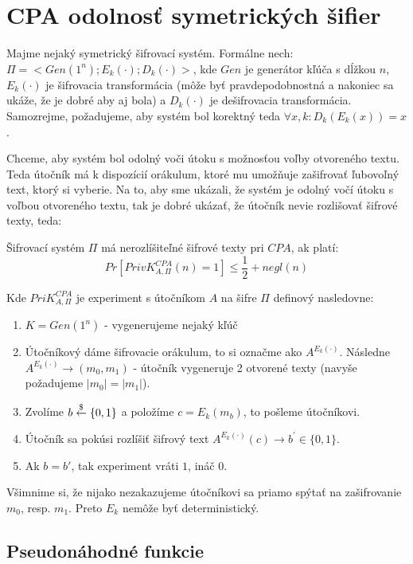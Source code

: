 \section{CPA odolnosť symetrických šifier}

Majme nejaký symetrický šifrovací systém. Formálne nech:
$\Pi = <Gen(1^n); E_k(\cdot); D_k(\cdot)>$, kde $Gen$ je generátor
kľúča s dĺžkou $n$, $E_k(\cdot)$ je šifrovacia transformácia (môže byť
pravdepodobnostná a nakoniec sa ukáže, že je dobré aby aj bola)
a $D_k(\cdot)$ je dešifrovacia transformácia. Samozrejme, požadujeme, aby
systém bol korektný teda $\forall x, k\colon D_k(E_k(x))=x$.

Chceme, aby systém bol odolný voči útoku s možnosťou voľby otvoreného textu.
Teda útočník má k dispozícií orákulum, ktoré mu umožňuje zašifrovať ľubovoľný
text, ktorý si vyberie. Na to, aby sme ukázali, že systém je odolný vočí 
útoku s voľbou otvoreného textu, tak je dobré ukázať, že útočník
nevie rozlišovať šifrové texty, teda:

\begin{definicia}
Šifrovací systém $\Pi$ má nerozlíšiteľné šifrové texty pri $CPA$, ak platí:
$$Pr[PrivK_{A,\Pi}^{CPA}(n) = 1] \leq \frac{1}{2} + negl(n)$$

Kde $PriK_{A,\Pi}^{CPA}$ je experiment s útočníkom $A$ na šifre $\Pi$ definový nasledovne:
\begin{enumerate}
\item $K = Gen(1^n)$ - vygenerujeme nejaký kľúč
\item Útočníkový dáme šifrovacie orákulum, to si označme ako $A^{E_k(\cdot)}$. Následne $A^{E_k(\cdot)} \to (m_0,m_1)$ -
útočník vygeneruje 2 otvorené texty (navyše požadujeme $|m_0| = |m_1|$). 
\item Zvolíme $b \overset{\$}{\leftarrow} \{0,1\}$ a položíme $c = E_k(m_b)$, to pošleme útočníkovi.
\item Útočník sa pokúsi rozlíšiť šifrový text $A^{E_k(\cdot)}(c) \to b^{'} \in \{0,1\}$.
\item Ak $b=b{'}$, tak experiment vráti $1$, ináč $0$.
\end{enumerate}
\end{definicia}

Všimnime si, že nijako nezakazujeme útočníkovi sa priamo spýtať na zašifrovanie $m_0$, resp. $m_1$. 
Preto $E_k$ nemôže byť deterministický. 

\subsection{Pseudonáhodné funkcie}

